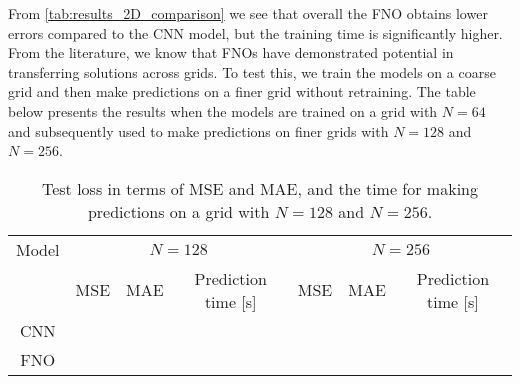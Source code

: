 From \autoref{tab:results_2D_comparison} we see that overall the FNO obtains lower errors compared to the CNN model, but the training time is significantly higher.
From the literature, we know that FNOs have demonstrated potential in transferring solutions across grids.
To test this, we train the models on a coarse grid and then make predictions on a finer grid without retraining.
The table below presents the results when the models are trained on a grid with $N = 64$ and subsequently used to make predictions on finer grids with $N = 128$ and $N = 256$.
\begin{table}[H]
    \centering
    \begin{tabular}{c|ccc|ccc}
        Model & \multicolumn{3}{c}{$N = 128$} & \multicolumn{3}{c}{$N = 256$} \\
        \cline{2-7}
        & MSE & MAE & Prediction time [s] & MSE & MAE & Prediction time [s] \\
        \hline
        CNN &
         &
         &
         &
         &
         &
         \\ \hline
        FNO  &
         &
         &
         &
         &
         &
         \\
    \end{tabular}
    \caption{Test loss in terms of MSE and MAE, and the time for making predictions on a grid with $N = 128$ and $N=256$.}\label{tab:results_2D_train_64_test_128_256}
\end{table}
